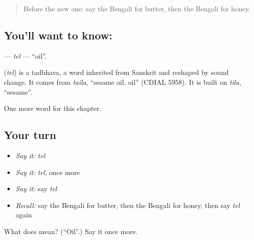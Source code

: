 \label{lesson:BN-C57-tel}



\begin{quote}
Before the new one: say the Bengali for butter, then the Bengali for honey.
\end{quote}

\subsection*{You'll want to know: }
\textbf{} — \emph{tel} — \textquotedblleft{}oil\textquotedblright{}.

\begin{cousinweb}
\textbf{} (\emph{tel}) is a tadbhava, a word inherited from Sanskrit and reshaped by sound change. It comes from \emph{taila}, \textquotedblleft{}sesame oil, oil\textquotedblright{} (CDIAL 5958). It is built on \emph{tila}, \textquotedblleft{}sesame\textquotedblright{}.
\end{cousinweb}

\begin{grammarlens}[title={What you've built}]
One more word for this chapter.
\end{grammarlens}

\subsection*{Your turn}
\begin{itemize}
\raggedright
  \item \emph{Say it:} \emph{tel}
  \item \emph{Say it:} \emph{tel}, once more
  \item \emph{Say it:} say \emph{tel}
  \item \emph{Recall:} say the Bengali for butter, then the Bengali for honey, then say \emph{tel} again
\end{itemize}

\begin{tcolorbox}[breakable,colback=teal!4,colframe=teal!35!black,title={Before you move on}]
What does  mean? (\textquotedblleft{}Oil\textquotedblright{}.) Say it once more.
\end{tcolorbox}
